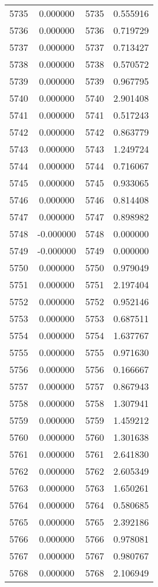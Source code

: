 \documentclass[12pt]{article}
\begin{document}
\begin{longtable}{@{}cccc@{}}
5735 & 0.000000 & 5735 & 0.555916 \\
5736 & 0.000000 & 5736 & 0.719729 \\
5737 & 0.000000 & 5737 & 0.713427 \\
5738 & 0.000000 & 5738 & 0.570572 \\
5739 & 0.000000 & 5739 & 0.967795 \\
5740 & 0.000000 & 5740 & 2.901408 \\
5741 & 0.000000 & 5741 & 0.517243 \\
5742 & 0.000000 & 5742 & 0.863779 \\
5743 & 0.000000 & 5743 & 1.249724 \\
5744 & 0.000000 & 5744 & 0.716067 \\
5745 & 0.000000 & 5745 & 0.933065 \\
5746 & 0.000000 & 5746 & 0.814408 \\
5747 & 0.000000 & 5747 & 0.898982 \\
5748 & -0.000000 & 5748 & 0.000000 \\
5749 & -0.000000 & 5749 & 0.000000 \\
5750 & 0.000000 & 5750 & 0.979049 \\
5751 & 0.000000 & 5751 & 2.197404 \\
5752 & 0.000000 & 5752 & 0.952146 \\
5753 & 0.000000 & 5753 & 0.687511 \\
5754 & 0.000000 & 5754 & 1.637767 \\
5755 & 0.000000 & 5755 & 0.971630 \\
5756 & 0.000000 & 5756 & 0.166667 \\
5757 & 0.000000 & 5757 & 0.867943 \\
5758 & 0.000000 & 5758 & 1.307941 \\
5759 & 0.000000 & 5759 & 1.459212 \\
5760 & 0.000000 & 5760 & 1.301638 \\
5761 & 0.000000 & 5761 & 2.641830 \\
5762 & 0.000000 & 5762 & 2.605349 \\
5763 & 0.000000 & 5763 & 1.650261 \\
5764 & 0.000000 & 5764 & 0.580685 \\
5765 & 0.000000 & 5765 & 2.392186 \\
5766 & 0.000000 & 5766 & 0.978081 \\
5767 & 0.000000 & 5767 & 0.980767 \\
5768 & 0.000000 & 5768 & 2.106949 \\

\end{longtable}
\end{document}
